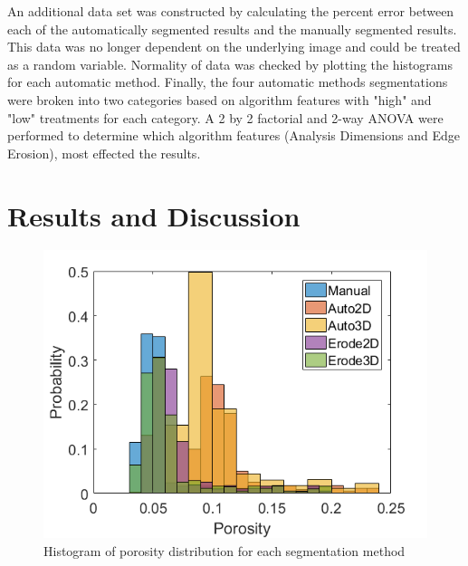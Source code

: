 \documentclass[12pt]{article}
\begin{document}
An additional data set was constructed by calculating the percent error between each of the automatically segmented results and the manually segmented results. This data was no longer dependent on the underlying image and could be treated as a random variable. Normality of data was checked by plotting the histograms for each automatic method. Finally, the four automatic methods segmentations were broken into two categories based on algorithm features with "high" and "low" treatments for each category. A 2 by 2 factorial and 2-way ANOVA were performed to determine which algorithm features (Analysis Dimensions and Edge Erosion), most effected the results. 

\section{Results and Discussion} 
\begin{figure}[H]
	\centering
	\includegraphics[width=1\textwidth]{DataHistograms.png}
	\caption{Histogram of porosity distribution for each segmentation method}
	\label{fig:DataHist}
\end{figure}
\end{document}
